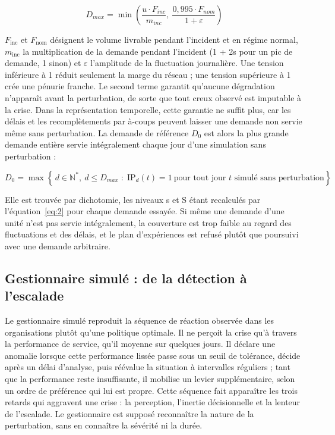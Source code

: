 \begin{equation}
D_{max} = \min\left(\frac{u \cdot F_{inc}}{m_{inc}},\ \frac{0{,}995 \cdot F_{nom}}{1 + \varepsilon}\right)
\label{eq:3}
\end{equation}

$F_{\mathrm{inc}}$ et $F_{\mathrm{nom}}$ désignent le volume livrable pendant l'incident et en régime normal, $m_{\mathrm{inc}}$ la multiplication de la demande pendant l'incident (1 + 2s pour un pic de demande, 1 sinon) et $\varepsilon$ l'amplitude de la fluctuation journalière. Une tension inférieure à 1 réduit seulement la marge du réseau ; une tension supérieure à 1 crée une pénurie franche. Le second terme garantit qu'aucune dégradation n'apparaît avant la perturbation, de sorte que tout creux observé est imputable à la crise. Dans la représentation temporelle, cette garantie ne suffit plus, car les délais et les recomplètements par à-coups peuvent laisser une demande non servie même sans perturbation. La demande de référence $D_{0}$ est alors la plus grande demande entière servie intégralement chaque jour d'une simulation sans perturbation :

\begin{equation}
D_0 = \max\left\{\, d \in \mathbb{N}^*,\ d \le D_{max} \;:\; \mathrm{IP}_d(t) = 1 \ \text{pour tout jour } t \text{ simulé sans perturbation} \right\}
\label{eq:4}
\end{equation}

Elle est trouvée par dichotomie, les niveaux s et S étant recalculés par l'équation~\eqref{eq:2} pour chaque demande essayée. Si même une demande d'une unité n'est pas servie intégralement, la couverture est trop faible au regard des fluctuations et des délais, et le plan d'expériences est refusé plutôt que poursuivi avec une demande arbitraire.

\subsection{Gestionnaire simulé : de la détection à l'escalade}
\label{sec:3.5}

Le gestionnaire simulé reproduit la séquence de réaction observée dans les organisations plutôt qu'une politique optimale. Il ne perçoit la crise qu'à travers la performance de service, qu'il moyenne sur quelques jours. Il déclare une anomalie lorsque cette performance lissée passe sous un seuil de tolérance, décide après un délai d'analyse, puis réévalue la situation à intervalles réguliers ; tant que la performance reste insuffisante, il mobilise un levier supplémentaire, selon un ordre de préférence qui lui est propre. Cette séquence fait apparaître les trois retards qui aggravent une crise : la perception, l'inertie décisionnelle et la lenteur de l'escalade. Le gestionnaire est supposé reconnaître la nature de la perturbation, sans en connaître la sévérité ni la durée.

